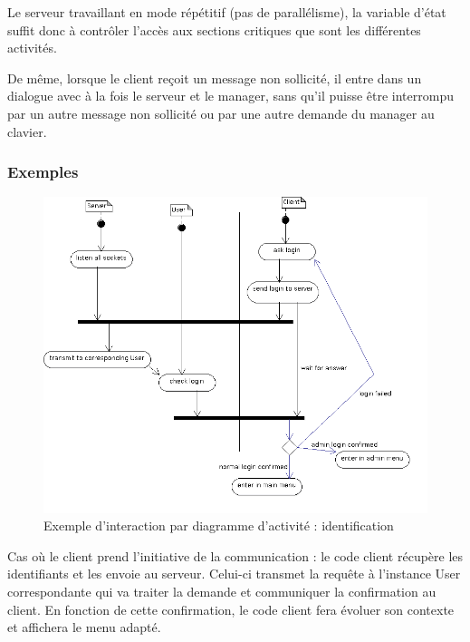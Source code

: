 \documentclass[a4paper,titlepage]{scrreprt}
\begin{document}
 Le serveur travaillant en mode répétitif (pas de parallélisme), la variable d'état suffit donc à contrôler l'accès
 aux sections critiques que sont les différentes activités.
 
 De même, lorsque le client reçoit un message non sollicité, il entre dans un dialogue avec à la fois le serveur et le manager,
 sans qu'il puisse être interrompu par un autre message non sollicité ou par une autre demande du manager au clavier.
 
  \subsubsection{Exemples}
    \begin{figure}[H]
    \center
    \includegraphics[scale=0.4]{uml/Activity_Login.png}
    \caption{Exemple d'interaction par diagramme d'activité : identification} \label{diag-login}
    \end{figure}
    Cas où le client prend l'initiative de la communication : le code client récupère les identifiants et les envoie au serveur.
    Celui-ci transmet la requête à l'instance User correspondante qui va traiter la demande et communiquer la confirmation au client.
    En fonction de cette confirmation, le code client fera évoluer son contexte et affichera le menu adapté.
\end{document}
